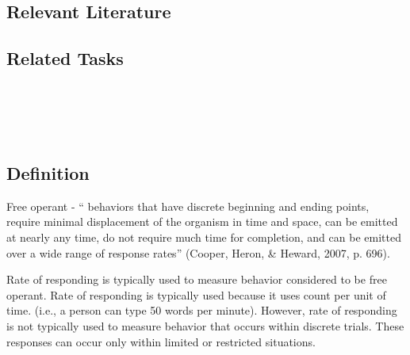 \subsection{Relevant Literature}
\begin{refsection}
\nocite{test,alang2017police,clayton2018black}
\printbibliography[heading=none]
\end{refsection}
%
\subsection{Related Tasks}
\fourdThree{}\\
\fourdFive{}\\
\fourdSix{}\\
%
%
%
%
%
%
%
\section[\fourdEight{}]{\fourdEight{}%
              }
\subsection{Definition} 
Free operant - `` behaviors that have discrete beginning and ending points, require minimal displacement of the organism in time and space, can be emitted at nearly any time, do not require much time for completion, and can be emitted over a wide range of response rates'' (Cooper, Heron, \& Heward, 2007, p. 696).

Rate of responding is typically used to measure behavior considered to be free operant. Rate of responding is typically used because it uses count per unit of time. (i.e., a person can type 50 words per minute). However, rate of responding is not typically used to measure behavior that occurs within discrete trials. These responses can occur only within limited or restricted situations. 

